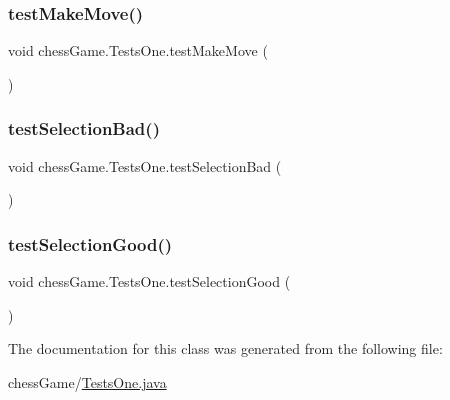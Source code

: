 \hypertarget{classchess_game_1_1_tests_one_a8fe235e622e35e564c11266c662aa1eb}{}\label{classchess_game_1_1_tests_one_a8fe235e622e35e564c11266c662aa1eb} 
\subsubsection{\texorpdfstring{test\+Make\+Move()}{testMakeMove()}}
{\footnotesize\ttfamily void chess\+Game.\+Tests\+One.\+test\+Make\+Move (\begin{DoxyParamCaption}{ }\end{DoxyParamCaption})}

\hypertarget{classchess_game_1_1_tests_one_ac7e3b12d75a0134942a6d1b78cf93e6d}{}\label{classchess_game_1_1_tests_one_ac7e3b12d75a0134942a6d1b78cf93e6d} 
\subsubsection{\texorpdfstring{test\+Selection\+Bad()}{testSelectionBad()}}
{\footnotesize\ttfamily void chess\+Game.\+Tests\+One.\+test\+Selection\+Bad (\begin{DoxyParamCaption}{ }\end{DoxyParamCaption})}

\hypertarget{classchess_game_1_1_tests_one_aea568b72ac003ecc7b6aef884c11ba1e}{}\label{classchess_game_1_1_tests_one_aea568b72ac003ecc7b6aef884c11ba1e} 
\subsubsection{\texorpdfstring{test\+Selection\+Good()}{testSelectionGood()}}
{\footnotesize\ttfamily void chess\+Game.\+Tests\+One.\+test\+Selection\+Good (\begin{DoxyParamCaption}{ }\end{DoxyParamCaption})}



The documentation for this class was generated from the following file\+:\begin{DoxyCompactItemize}
\item 
chess\+Game/\hyperlink{_tests_one_8java}{Tests\+One.\+java}\end{DoxyCompactItemize}
